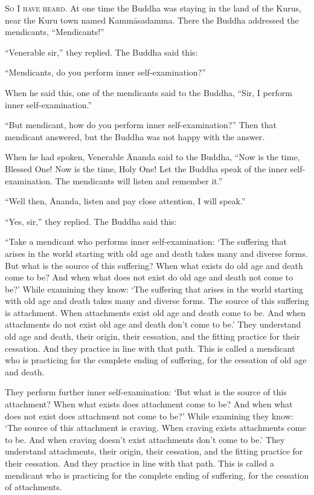 \documentclass[12pt,openany]{book}%
\newcommand*{\scevam}[1]{\textsc{#1}}
\begin{document}
\scevam{So I have heard. }At one time the Buddha was staying in the land of the Kurus, near the Kuru town named \textsanskrit{Kammāsadamma}. There the Buddha addressed the mendicants, “Mendicants!” 

“Venerable sir,” they replied. The Buddha said this: 

“Mendicants, do you perform inner self-examination?” 

When he said this, one of the mendicants said to the Buddha, “Sir, I perform inner self-examination.” 

“But mendicant, how do you perform inner self-examination?” Then that mendicant answered, but the Buddha was not happy with the answer. 

When he had spoken, Venerable Ānanda said to the Buddha, “Now is the time, Blessed One! Now is the time, Holy One! Let the Buddha speak of the inner self-examination. The mendicants will listen and remember it.” 

“Well then, Ānanda, listen and pay close attention, I will speak.” 

“Yes, sir,” they replied. The Buddha said this: 

“Take a mendicant who performs inner self-examination: ‘The suffering that arises in the world starting with old age and death takes many and diverse forms. But what is the source of this suffering? When what exists do old age and death come to be? And when what does not exist do old age and death not come to be?’ While examining they know: ‘The suffering that arises in the world starting with old age and death takes many and diverse forms. The source of this suffering is attachment. When attachments exist old age and death come to be. And when attachments do not exist old age and death don’t come to be.’ They understand old age and death, their origin, their cessation, and the fitting practice for their cessation. And they practice in line with that path. This is called a mendicant who is practicing for the complete ending of suffering, for the cessation of old age and death. 

They perform further inner self-examination: ‘But what is the source of this attachment? When what exists does attachment come to be? And when what does not exist does attachment not come to be?’ While examining they know: ‘The source of this attachment is craving. When craving exists attachments come to be. And when craving doesn’t exist attachments don’t come to be.’ They understand attachments, their origin, their cessation, and the fitting practice for their cessation. And they practice in line with that path. This is called a mendicant who is practicing for the complete ending of suffering, for the cessation of attachments. 
\end{document}
